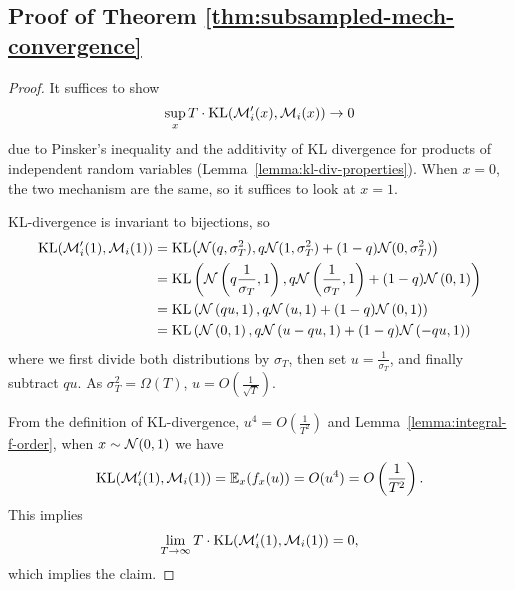 \documentclass{article}
\theoremstyle{plain}
\theoremstyle{definition}
\theoremstyle{remark}
\begin{document}
\subsection{Proof of Theorem \ref{thm:subsampled-mech-convergence}}
\label{app:subsampled-mech-convergence}
\theoremsubsampledmechconvergence*
\begin{proof}
    It suffices to show
    \begin{equation}
        \sup_x T\cdot \mathrm{KL}(\mathcal{M}_i'(x), \mathcal{M}_i(x)) \to 0
    \end{equation}
    due to Pinsker's inequality and the additivity of KL divergence for products of independent
    random variables (Lemma~\ref{lemma:kl-div-properties}). 
    When $x = 0$, the two mechanism are the same, so it suffices to look at $x = 1$. 

    KL-divergence is invariant to bijections, so
    \begin{equation}
        \begin{split}
            \mathrm{KL}(\mathcal{M}_i'(1), \mathcal{M}_i(1)) 
            &= \mathrm{KL}\big(\mathcal{N}(q, \sigma_T^2), q\mathcal{N}(1, \sigma_T^2) + (1 - q)\mathcal{N}(0, \sigma_T^2)\big)
            \\&= \mathrm{KL}\left(\mathcal{N}\left(q\frac{1}{\sigma_T}, 1\right), 
            q\mathcal{N}\left(\frac{1}{\sigma_T}, 1\right) + (1 - q)\mathcal{N}\left(0, 1\right)\right)
            \\&= \mathrm{KL}\left(\mathcal{N}\left(qu, 1\right), 
            q\mathcal{N}\left(u, 1\right) + (1 - q)\mathcal{N}\left(0, 1\right)\right)
            \\&= \mathrm{KL}\left(\mathcal{N}\left(0, 1\right), 
            q\mathcal{N}\left(u - qu, 1\right) + (1 - q)\mathcal{N}\left(-qu, 1\right)\right)
        \end{split}
    \end{equation}
    where we first divide both distributions by $\sigma_T$, then set $u = \frac{1}{\sigma_T}$, and 
    finally subtract $qu$. As $\sigma^2_T = \Omega(T)$, $u = O\left(\frac{1}{\sqrt{T}}\right)$.

    From the definition of KL-divergence, $u^4 = O(\frac{1}{T^2})$ and Lemma~\ref{lemma:integral-f-order}, 
    when $x\sim \mathcal{N}(0, 1)$ we have
    \begin{equation}
        \mathrm{KL}(\mathcal{M}_i'(1), \mathcal{M}_i(1)) = \operatorname{\mathbb{E}}_x(f_x(u)) = O(u^4) = O\left(\frac{1}{T^2}\right).
    \end{equation}
    This implies 
    \begin{equation}
        \lim_{T\to \infty} T\cdot \mathrm{KL}(\mathcal{M}_i'(1), \mathcal{M}_i(1)) = 0,
    \end{equation}
    which implies the claim.
\end{proof}
\end{document}
